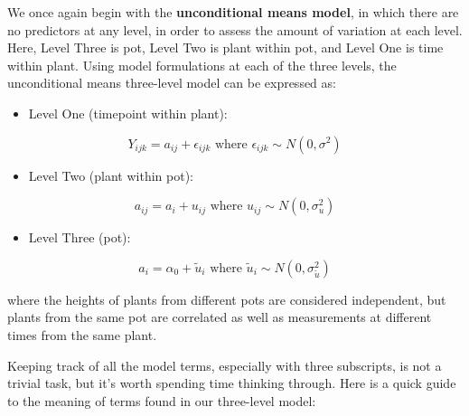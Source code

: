 \documentclass[
]{krantz}
\providecommand{\tightlist}{%
  \setlength{\itemsep}{0pt}\setlength{\parskip}{0pt}}
\begin{document}
We once again begin with the \textbf{unconditional means model},  in which there are no predictors at any level, in order to assess the amount of variation at each level. Here, Level Three is pot, Level Two is plant within pot, and Level One is time within plant. Using model formulations at each of the three levels, the unconditional means three-level model can be expressed as:

\begin{itemize}
\tightlist
\item
  Level One (timepoint within plant):
\end{itemize}

\begin{equation*}
Y_{ijk} = a_{ij}+\epsilon_{ijk} \textrm{ where } \epsilon_{ijk}\sim N(0,\sigma^2)
\end{equation*}

\begin{itemize}
\tightlist
\item
  Level Two (plant within pot):
\end{itemize}

\begin{equation*}
a_{ij} = a_{i}+u_{ij} \textrm{ where } u_{ij}\sim N(0,\sigma_{u}^{2})
\end{equation*}

\begin{itemize}
\tightlist
\item
  Level Three (pot):
\end{itemize}

\begin{equation*}
a_{i} = \alpha_{0}+\tilde{u}_{i} \textrm{ where } \tilde{u}_{i} \sim N(0,\sigma_{\tilde{u}}^{2})
\end{equation*}

where the heights of plants from different pots are considered independent, but plants from the same pot are correlated as well as measurements at different times from the same plant.

Keeping track of all the model terms, especially with three subscripts, is not a trivial task, but it's worth spending time thinking through. Here is a quick guide to the meaning of terms found in our three-level model:
\end{document}
